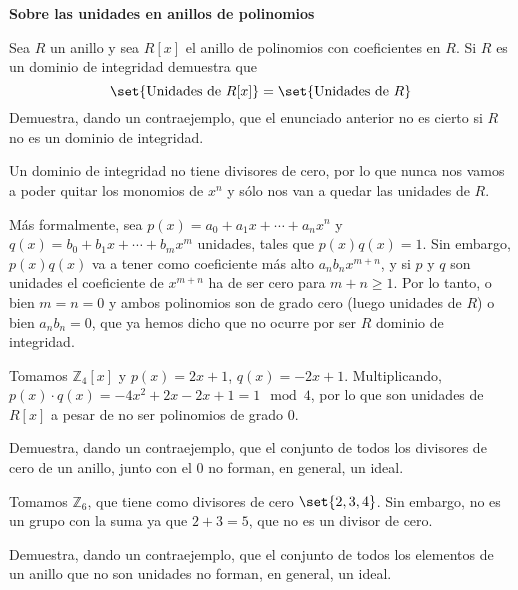 \begin{problem}
{\bf Sobre las unidades en anillos de polinomios}

Sea $R$ un anillo y sea $R[x]$ el anillo de polinomios con coeficientes en $R$.
\ppart Si $R$ es un dominio de integridad demuestra que
\[ \set{\text{Unidades de } R[x]} = \set{\text{Unidades de } R} \]
\ppart Demuestra, dando un contraejemplo, que el enunciado anterior no es cierto si $R$ no es un dominio de integridad.
\solution


\spart

Un dominio de integridad no tiene divisores de cero, por lo que nunca nos vamos a poder quitar los monomios de $x^n$ y sólo nos van a quedar las unidades de $R$.

Más formalmente, sea $p(x) = a_0 + a_1 x + \dotsb + a_nx^n$ y $q(x) = b_0 + b_1 x + \dotsb + b_mx^m$ unidades, tales que $p(x) q(x) = 1$. Sin embargo, $p(x) q(x)$ va a tener como coeficiente más alto $a_n b_n x^{m+n}$, y si $p$ y $q$ son unidades el coeficiente de $x^{m+n}$ ha de ser cero para $m+n ≥ 1$. Por lo tanto, o bien $m = n = 0$ y ambos polinomios son de grado cero (luego unidades de $R$) o bien $a_n b_n = 0$, que ya hemos dicho que no ocurre por ser $R$ dominio de integridad.

\spart

Tomamos $ℤ_4[x]$ y $p(x) = 2x + 1$, $q(x) = -2x + 1$. Multiplicando, $p(x) · q(x) = -4x^2 +2x -2x + 1 = 1 \mod 4$, por lo que son unidades de $R[x]$ a pesar de no ser polinomios de grado 0.

\end{problem}

\begin{problem}
Demuestra, dando un contraejemplo, que el conjunto de todos los divisores de cero de un anillo, junto con el 0 no forman, en general, un ideal.
\solution


Tomamos $ℤ_{6}$, que tiene como divisores de cero $\set{2,3,4}$. Sin embargo, no es un grupo con la suma ya que $2 + 3 = 5$, que no es un divisor de cero.


\end{problem}

\begin{problem}
Demuestra, dando un contraejemplo, que el conjunto de todos los elementos de un anillo que no son unidades no forman, en general, un ideal.
\solution
\end{problem}

